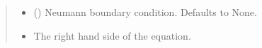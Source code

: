 \documentclass[a4paper,11pt,english,openany]{sphinxmanual}
\begin{document}
\begin{fulllineitems}
\begin{quote}
\begin{description}
\begin{itemize}
\item {} 
\sphinxAtStartPar
{} (\sphinxstyleliteralemphasis{\sphinxupquote{, }}) \textendash{} Neumann boundary condition. Defaults to None.

\item {} 
\sphinxAtStartPar
{} \textendash{} The right hand side of the equation.

\end{itemize}

\end{description}\end{quote}

\end{fulllineitems}

\end{document}
